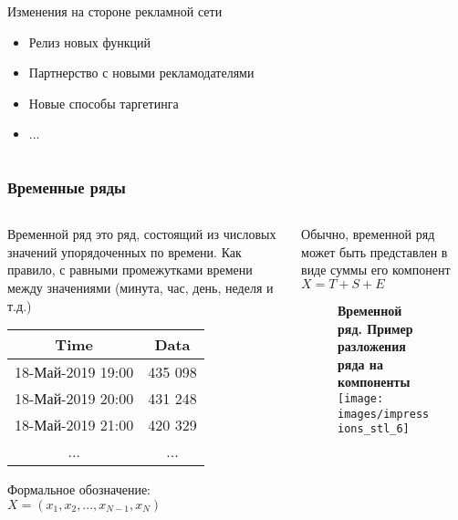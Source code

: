 \documentclass[intlimits, 9pt, unicode]{beamer}
\begin{document}
\begin{frame}
{\begin{columns}
        \begin{column}{5cm}
        Изменения на стороне рекламной сети
         \begin{itemize}
    		\item Релиз новых функций
		\item Партнерство с новыми рекламодателями
		\item Новые способы таргетинга
		\item ...
   	 \end{itemize}
	 \end{column}
    \end{columns}}

 \end{frame}


\begin{frame}
    \frametitle{Временные ряды}
	
    {\begin{columns}
        \begin{column}{5.5cm}
 Временной ряд это ряд, состоящий из числовых значений упорядоченных по времени. Как правило, с равными промежутками времени между значениями (минута, час, день, неделя и т.д.)
 

\vspace{0.3cm}
\begin{table}[h!]
\centering
 \begin{tabular}{||c c||}
 \hline
 Time & Data \\ [0.5ex]
 \hline\hline
 18-Май-2019 19:00 & 435 098 \\
 \hline
 18-Май-2019 20:00 & 431 248  \\
 \hline
 18-Май-2019 21:00 & 420 329  \\
 \hline
 ... & ... \\ [1ex]
 \hline
\end{tabular}
\end{table}

	
\vspace{0.3cm} Формальное обозначение:
 $ X = (x_1, x_2, ... , x_{N-1} , x_N)  $

        \end{column}

\hspace{-0.5cm}
        \begin{column}{5cm}
Обычно, временной ряд может быть представлен в виде суммы его компонент $X = T + S + E$
        \begin{figure}
        \centering
	\textbf{Временной ряд. Пример разложения ряда на компоненты}
        \texttt{[image: images/impressions\_stl\_6]}
	\end{figure}
	
        \end{column}
    \end{columns}}
\end{frame}
\end{document}
